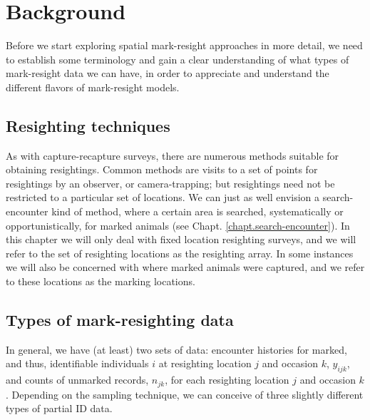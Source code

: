 \section{Background}

Before we start exploring spatial mark-resight approaches in more
detail, we need to establish some terminology and gain a clear
understanding of what types of mark-resight data we can have, in order
to appreciate and understand the different flavors of mark-resight
models.

\subsection{Resighting techniques}
As with capture-recapture surveys, there are numerous methods suitable
for obtaining resightings. Common methods are visits to a set of points
for resightings by an observer, or camera-trapping; but resightings
need not be restricted to a particular set of locations. We can just
as well envision a search-encounter kind of method, where a certain
area is searched, systematically or opportunistically, for marked
animals (see Chapt. \ref{chapt.search-encounter}). In this chapter we
will only deal with fixed location resighting surveys, and we will
refer to the set of resighting locations as the resighting array. In
some instances we will also be concerned with where marked animals
were captured, and we refer to these locations as the marking
locations.

\subsection{Types of mark-resighting data}

In general, we have (at least) two sets of data: encounter histories
for marked, and thus, identifiable individuals $i$ at resighting
location $j$ and occasion $k$, $y_{ijk}$, and counts of unmarked
records, $n_{jk}$, for each resighting location $j$ and occasion $k$.
Depending on the sampling technique, we can conceive of three slightly
different types of partial ID data.


